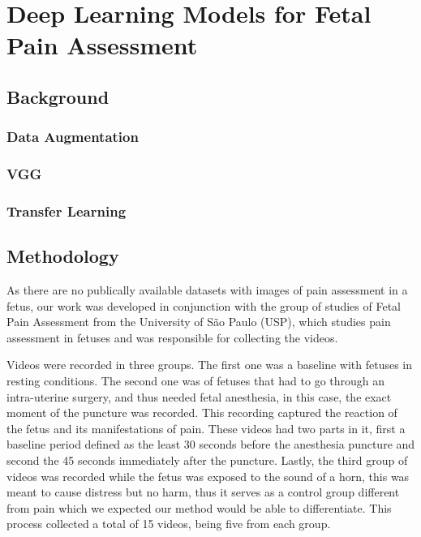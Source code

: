 \chapter{Deep Learning Models for Fetal Pain Assessment}

\section{Background}

\subsection{Data Augmentation}

\subsection{VGG}

\subsection{Transfer Learning}

\section{Methodology}

As there are no publically available datasets with images of pain assessment in a fetus, our work was developed in conjunction with the group of studies of Fetal Pain Assessment from the University of São Paulo (USP), which studies pain assessment in fetuses and was responsible for collecting the videos.

Videos were recorded in three groups. The first one was a baseline with fetuses in resting conditions. The second one was of fetuses that had to go through an intra-uterine surgery, and thus needed fetal anesthesia, in this case, the exact moment of the puncture was recorded. This recording captured the reaction of the fetus and its manifestations of pain. These videos had two parts in it, first a baseline period defined as the least 30 seconds before the anesthesia puncture and second the 45 seconds immediately after the puncture. Lastly, the third group of videos was recorded while the fetus was exposed to the sound of a horn, this was meant to cause distress but no harm, thus it serves as a control group different from pain which we expected our method would be able to differentiate. This process collected a total of 15 videos, being five from each group.

